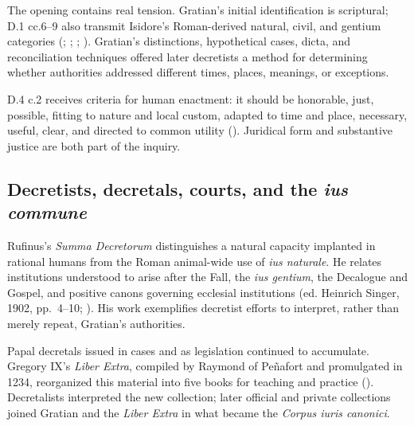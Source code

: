 The opening contains real tension. Gratian's initial identification is scriptural; D.1 cc.6--9 also transmit Isidore's Roman-derived natural, civil, and gentium categories (; ; ; ). Gratian's distinctions, hypothetical cases, dicta, and reconciliation techniques offered later decretists a method for determining whether authorities addressed different times, places, meanings, or exceptions.

D.4 c.2 receives criteria for human enactment: it should be honorable, just, possible, fitting to nature and local custom, adapted to time and place, necessary, useful, clear, and directed to common utility (). Juridical form and substantive justice are both part of the inquiry.

\subsection{Decretists, decretals, courts, and the \emph{ius commune}}

Rufinus's \emph{Summa Decretorum} distinguishes a natural capacity implanted in rational humans from the Roman animal-wide use of \emph{ius naturale}. He relates institutions understood to arise after the Fall, the \emph{ius gentium}, the Decalogue and Gospel, and positive canons governing ecclesial institutions (ed. Heinrich Singer, 1902, pp.~4--10; ). His work exemplifies decretist efforts to interpret, rather than merely repeat, Gratian's authorities.

Papal decretals issued in cases and as legislation continued to accumulate. Gregory IX's \emph{Liber Extra}, compiled by Raymond of Peñafort and promulgated in 1234, reorganized this material into five books for teaching and practice (). Decretalists interpreted the new collection; later official and private collections joined Gratian and the \emph{Liber Extra} in what became the \emph{Corpus iuris canonici}.

